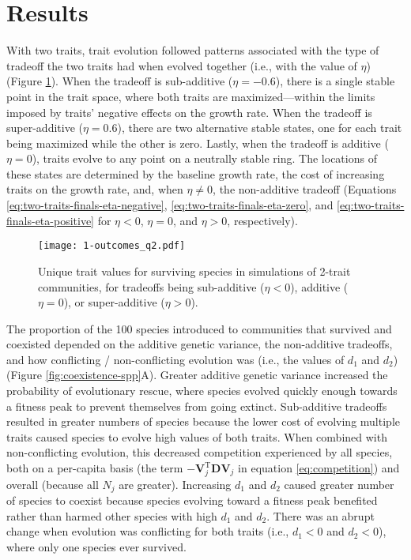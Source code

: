 \section*{Results}


With two traits, trait evolution followed patterns associated with the type 
of tradeoff the two traits had when evolved together
(i.e., with the value of $\eta$)
(Figure \ref{fig:two-trait-outcomes}).
When the tradeoff is sub-additive ($\eta = -0.6$), there is a single
stable point in the trait space, where both traits are
maximized---within the limits imposed by traits' negative effects on 
the growth rate.
When the tradeoff is super-additive ($\eta = 0.6$), there are two
alternative stable states, one for each trait being maximized while the 
other is zero.
Lastly, when the tradeoff is additive ($\eta = 0$), traits
evolve to any point on a neutrally stable ring.
The locations of these states are determined by 
the baseline growth rate, 
the cost of increasing traits on the growth rate,
and, when $\eta \ne 0$, the non-additive tradeoff
(Equations \ref{eq:two-traits-finals-eta-negative},
\ref{eq:two-traits-finals-eta-zero}, and 
\ref{eq:two-traits-finals-eta-positive} for 
$\eta < 0$, $\eta = 0$, and $\eta > 0$, respectively).

\begin{figure}[ht!]
\centering
\texttt{[image: 1-outcomes\_q2.pdf]}
\caption{Unique trait values for surviving species in simulations of 2-trait communities,
    for tradeoffs being sub-additive ($\eta < 0$), additive ($\eta = 0$), or 
    super-additive ($\eta > 0$).}
\label{fig:two-trait-outcomes}
\end{figure}




The proportion of the 100 species introduced to communities that survived and
coexisted depended on the additive genetic variance, 
the non-additive tradeoffs, and 
how conflicting / non-conflicting evolution was (i.e., the values of $d_1$ 
and $d_2$) (Figure \ref{fig:coexistence-spp}A).
Greater additive genetic variance increased the probability of evolutionary 
rescue, where species evolved quickly enough towards a fitness peak to
prevent themselves from going extinct.
Sub-additive tradeoffs resulted in greater numbers of species because
the lower cost of evolving multiple traits caused species to evolve
high values of both traits.
When combined with non-conflicting evolution,
this decreased competition experienced by all species, both on a 
per-capita basis (the term $- \mathbf{V}_{j}^{\text{T}} \mathbf{D} \mathbf{V}_j$ 
in equation \ref{eq:competition})
and overall (because all $N_j$ are greater).
Increasing $d_1$ and $d_2$ caused greater number of species to coexist
because species evolving toward a fitness peak benefited rather than 
harmed other species with high $d_1$ and $d_2$.
There was an abrupt change when evolution was conflicting for both traits 
(i.e., $d_1 < 0$ and $d_2 < 0$),
where only one species ever survived.

